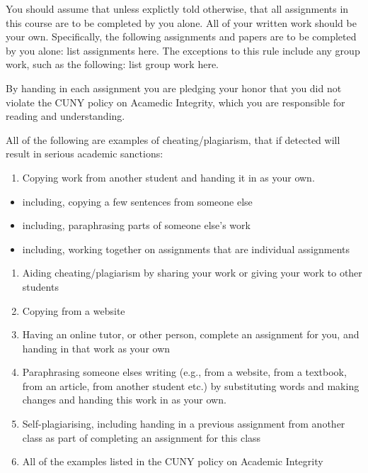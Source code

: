\documentclass[]{book}
\providecommand{\tightlist}{%
  \setlength{\itemsep}{0pt}\setlength{\parskip}{0pt}}
\theoremstyle{definition}
\theoremstyle{definition}
\theoremstyle{definition}
\theoremstyle{remark}
\begin{document}
You should assume that unless explictly told otherwise, that all
assignments in this course are to be completed by you alone. All of your
written work should be your own. Specifically, the following assignments
and papers are to be completed by you alone: list assignments here. The
exceptions to this rule include any group work, such as the following:
list group work here.

By handing in each assignment you are pledging your honor that you did
not violate the CUNY policy on Acamedic Integrity, which you are
responsible for reading and understanding.

All of the following are examples of cheating/plagiarism, that if
detected will result in serious academic sanctions:

\begin{enumerate}
\def\labelenumi{\arabic{enumi}.}
\tightlist
\item
  Copying work from another student and handing it in as your own.
\end{enumerate}

\begin{itemize}
\tightlist
\item
  including, copying a few sentences from someone else
\item
  including, paraphrasing parts of someone else's work
\item
  including, working together on assignments that are individual
  assignments
\end{itemize}

\begin{enumerate}
\def\labelenumi{\arabic{enumi}.}
\setcounter{enumi}{1}
\tightlist
\item
  Aiding cheating/plagiarism by sharing your work or giving your work to
  other students
\item
  Copying from a website
\item
  Having an online tutor, or other person, complete an assignment for
  you, and handing in that work as your own
\item
  Paraphrasing someone elses writing (e.g., from a website, from a
  textbook, from an article, from another student etc.) by substituting
  words and making changes and handing this work in as your own.
\item
  Self-plagiarising, including handing in a previous assignment from
  another class as part of completing an assignment for this class
\item
  All of the examples listed in the CUNY policy on Academic Integrity
\end{enumerate}
\end{document}
